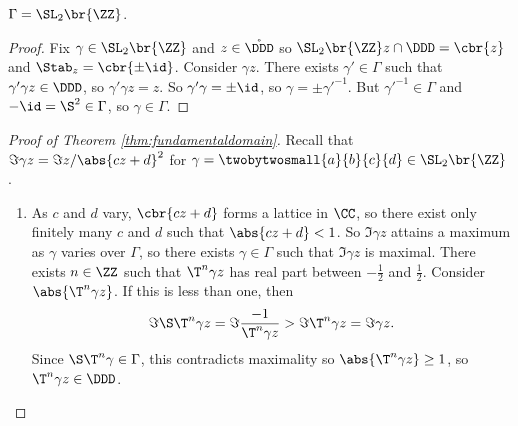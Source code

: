 \begin{corollary}
$ \Gamma = \SL_2\br{\ZZ} $.
\end{corollary}

\begin{proof}
Fix $ \gamma \in \SL_2\br{\ZZ} $ and $ z \in \mathring{\DDD} $ so $ \SL_2\br{\ZZ}z \cap \DDD = \cbr{z} $ and $ \Stab_z = \cbr{\pm\id} $. Consider $ \gamma z $. There exists $ \gamma' \in \Gamma $ such that $ \gamma'\gamma z \in \DDD $, so $ \gamma'\gamma z = z $. So $ \gamma'\gamma = \pm\id $, so $ \gamma = \pm\gamma'^{-1} $. But $ \gamma'^{-1} \in \Gamma $ and $ -\id = \S^2 \in \Gamma $, so $ \gamma \in \Gamma $.
\end{proof}

\pagebreak

\begin{proof}[Proof of Theorem \ref{thm:fundamentaldomain}]
Recall that $ \Im \gamma z = \Im z / \abs{cz + d}^2 $ for $ \gamma = \twobytwosmall{a}{b}{c}{d} \in \SL_2\br{\ZZ} $.
\begin{enumerate}
\item As $ c $ and $ d $ vary, $ \cbr{cz + d} $ forms a lattice in $ \CC $, so there exist only finitely many $ c $ and $ d $ such that $ \abs{cz + d} < 1 $. So $ \Im \gamma z $ attains a maximum as $ \gamma $ varies over $ \Gamma $, so there exists $ \gamma \in \Gamma $ such that $ \Im \gamma z $ is maximal. There exists $ n \in \ZZ $ such that $ \T^n\gamma z $ has real part between $ -\tfrac{1}{2} $ and $ \tfrac{1}{2} $. Consider $ \abs{\T^n\gamma z} $. If this is less than one, then
$$ \Im \S\T^n\gamma z = \Im \dfrac{-1}{\T^n\gamma z} > \Im \T^n\gamma z = \Im \gamma z. $$
Since $ \S\T^n\gamma \in \Gamma $, this contradicts maximality so $ \abs{\T^n\gamma z} \ge 1 $, so $ \T^n\gamma z \in \DDD $.



\end{enumerate}
\end{proof}
